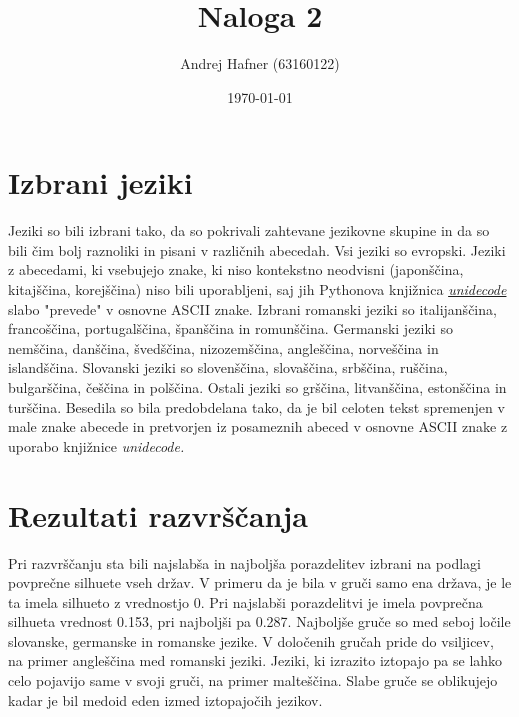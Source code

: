 \documentclass[a4paper,11pt]{article}
\title{Naloga 2}
\author{Andrej Hafner (63160122)}
\date{\today}
\begin{document}
\maketitle



\section{Izbrani jeziki}
Jeziki so bili izbrani tako, da so pokrivali zahtevane jezikovne skupine in da so bili čim bolj raznoliki in pisani v različnih abecedah. Vsi jeziki so evropski. Jeziki z abecedami, ki vsebujejo znake, ki niso kontekstno neodvisni (japonščina, kitajščina, korejščina) niso bili uporabljeni, saj jih Pythonova knjižnica \href{https://pypi.org/project/Unidecode/}{\it{unidecode}} slabo "prevede"  v osnovne ASCII znake. Izbrani romanski jeziki so italijanščina, francoščina, portugalščina, španščina in romunščina. Germanski jeziki so nemščina, danščina, švedščina, nizozemščina, angleščina, norveščina in islandščina. Slovanski jeziki so slovenščina, slovaščina, srbščina, ruščina, bulgarščina, češčina in polščina. Ostali jeziki so grščina, litvanščina, estonščina in turščina. Besedila so bila predobdelana tako, da je bil celoten tekst spremenjen v male znake abecede in pretvorjen iz posameznih abeced v osnovne ASCII znake z uporabo knjižnice \it{unidecode}.


\normalfont
\section{Rezultati razvrščanja}
Pri razvrščanju sta bili najslabša in najboljša porazdelitev izbrani na podlagi povprečne silhuete vseh držav. V primeru da je bila v gruči samo ena država, je le ta imela silhueto z vrednostjo 0. Pri najslabši porazdelitvi je imela povprečna silhueta vrednost 0.153, pri najboljši pa 0.287. Najboljše gruče so med seboj ločile slovanske, germanske in romanske jezike. V določenih gručah pride do vsiljicev, na primer angleščina med romanski jeziki. Jeziki, ki izrazito iztopajo pa se lahko celo pojavijo same v svoji gruči, na primer malteščina. Slabe gruče se oblikujejo kadar je bil medoid eden izmed iztopajočih jezikov.
\end{document}
